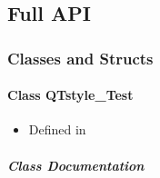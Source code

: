 \documentclass[letterpaper,10pt,english]{sphinxmanual}
\begin{document}
\subsection{Full API}
\label{\detokenize{api/library_root:full-api}}

\subsubsection{Classes and Structs}
\label{\detokenize{api/library_root:classes-and-structs}}
\sphinxstepscope


\paragraph{Class QTstyle\_Test}
\label{\detokenize{api/classQTstyle__Test:class-qtstyle-test}}\label{\detokenize{api/classQTstyle__Test:exhale-class-classqtstyle-test}}\label{\detokenize{api/classQTstyle__Test::doc}}\begin{itemize}
\item {} 
\sphinxAtStartPar
Defined in 

\end{itemize}


\subparagraph{Class Documentation}
\label{\detokenize{api/classQTstyle__Test:class-documentation}}
\end{document}
